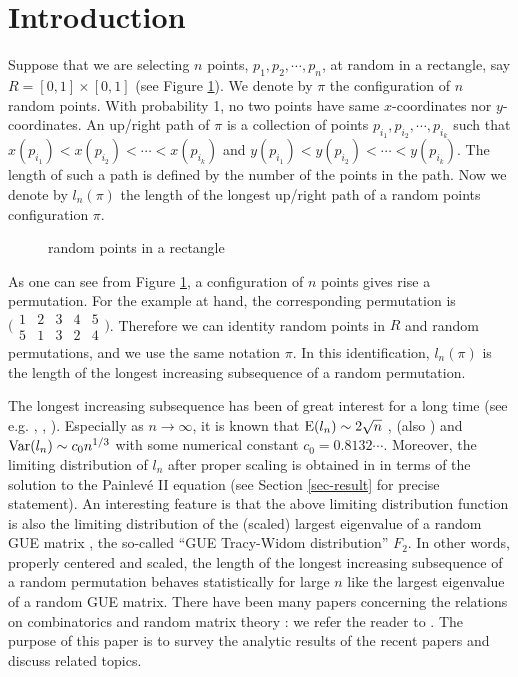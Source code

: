 \section{Introduction}\label{sec-intro}

Suppose that we are selecting $n$ points, $p_1,p_2,\cdots,p_n$, 
at random in a rectangle, 
say $R=[0,1]\times[0,1]$ (see Figure \ref{fig-randompoints}). 
We denote by $\pi$ the configuration of $n$ random points.
With probability 1, no two points have same $x$-coordinates nor $y$-coordinates.
An up/right path of $\pi$ 
is a collection of points $p_{i_1},p_{i_2},\cdots,p_{i_k}$ 
such that $x(p_{i_1})<x(p_{i_2})<\cdots<x(p_{i_k})$ 
and $y(p_{i_1})<y(p_{i_2})<\cdots<y(p_{i_k})$.
The length of such a path is defined by the number of the points in the path.
Now we denote by $l_n(\pi)$ the length of the longest up/right path 
of a random points configuration $\pi$.

\begin{figure}[ht]
 \centerline{}
 \caption{random points in a rectangle}
\label{fig-randompoints}
\end{figure}

As one can see from Figure \ref{fig-randompoints}, a configuration of $n$ 
points gives rise a permutation. 
For the example at hand, the corresponding permutation is 
$\bigl( \begin{smallmatrix}1&2&3&4&5\\5&1&3&2&4\end{smallmatrix}\bigr)$.
Therefore we can identity random points in $R$ and random permutations, 
and we use the same notation $\pi$. 
In this identification, $l_n(\pi)$ is the length of the longest increasing 
subsequence of a random permutation.

The longest increasing subsequence has been of great interest 
for a long time (see e.g. \cite{AD}, \cite{OR}, \cite{BDJ}).
Especially as $n\to\infty$, it is known that 
$\operatorname{E}(l_n)\sim 2\sqrt{n}$ \cite{LS}, \cite{VK1, VK2} (also \cite{AD95,
Se95, Jo2})
and $\operatorname{Var}(l_n)\sim c_0n^{1/3}$ \cite{BDJ} 
with some numerical constant $c_0=0.8132\cdots$.
Moreover, the limiting distribution 
of $l_n$ after proper scaling 
is obtained in \cite{BDJ} in terms of the solution to the 
Painlev\'e II equation 
(see Section \ref{sec-result} for precise statement).
An interesting feature is that the above limiting distribution function
is also the limiting 
distribution of the (scaled) largest eigenvalue of a random GUE matrix 
\cite{TW1}, the so-called ``GUE Tracy-Widom distribution'' $F_2$. 
In other words, properly centered and scaled, the length of the longest 
increasing subsequence of a random permutation behaves statistically 
for large $n$ like the largest eigenvalue of a random GUE matrix.
There have been many papers concerning the relations on 
combinatorics and random matrix theory : 
we refer the reader to \cite{Re, Gessel, Kerov, Rains, Jo2, 
BDJ, BDJ2, TW3, Bo, 
kurtj:shape, kurtj:trans, Ok, BOO, TW:randomwords, kurtj:recent, 
BR1, BR2}. 
The purpose of this paper is to survey the analytic results of 
the recent papers \cite{BR1, BR2} 
and discuss related topics.


